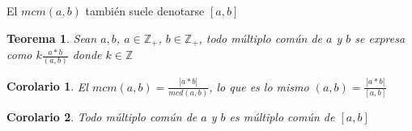 \documentclass[a4paper,1pt]{report}
\newtheorem*{teo}{Teorema}
\newtheorem*{cor}{Corolario}
\begin{document}
El $mcm(a,b)$ también suele denotarse $[a,b]$ 

\begin{teo}
 Sean $a,b$, $a\in\mathbb{Z}_+$, $b\in\mathbb{Z}_+$, todo múltiplo común de $a$ y $b$ se expresa como $k\frac{a*b}{(a,b)}$ donde $k\in\mathbb{Z}$
\end{teo}

\begin{cor}
 El $mcm(a,b)=\frac{|a*b|}{mcd(a,b)}$, lo que es lo mismo $(a,b)=\frac{|a*b|}{[a,b]}$
\end{cor}

\begin{cor}
 Todo múltiplo común de $a$ y $b$ es múltiplo común de $[a,b]$
\end{cor}
\end{document}
